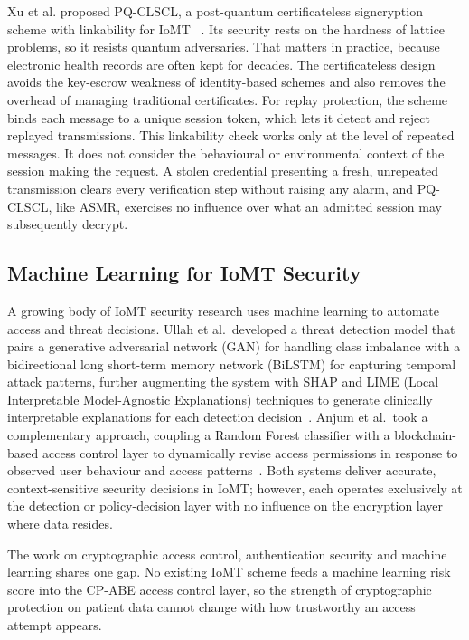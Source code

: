 Xu et al. proposed PQ-CLSCL, a post-quantum certificateless signcryption scheme with linkability for IoMT ~\cite{xu2025pqclscl}. Its security rests on the hardness of lattice problems, so it resists quantum adversaries. That matters in practice, because electronic health records are often kept for decades. The certificateless design avoids the key-escrow weakness of identity-based schemes and also removes the overhead of managing traditional certificates. For replay protection, the scheme binds each message to a unique session token, which lets it detect and reject replayed transmissions. This linkability check works only at the level of repeated messages. It does not consider the behavioural or environmental context of the session making the request. A stolen credential presenting a fresh, unrepeated transmission clears every verification step without raising any alarm, and PQ-CLSCL, like ASMR, exercises no influence over what an admitted session may subsequently decrypt.

\subsection{Machine Learning for IoMT Security} %
\label{sec1.1.3}

A growing body of IoMT security research uses machine learning to automate access and threat decisions. Ullah et al.\ developed a threat detection model that pairs a generative adversarial network (GAN) for handling class imbalance with a bidirectional long short-term memory network (BiLSTM) for capturing temporal attack patterns, further augmenting the system with SHAP and LIME (Local Interpretable Model-Agnostic Explanations) techniques to generate clinically interpretable explanations for each detection decision~\cite{ullah2025interpretable}. Anjum et al.\ took a complementary approach, coupling a Random Forest classifier with a blockchain-based access control layer to dynamically revise access permissions in response to observed user behaviour and access patterns~\cite{anjum2025blockchain}. Both systems deliver accurate, context-sensitive security decisions in IoMT; however, each operates exclusively at the detection or policy-decision layer with no influence on the encryption layer where data resides.

The work on cryptographic access control, authentication security and machine learning shares one gap. No existing IoMT scheme feeds a machine learning risk score into the CP-ABE access control layer, so the strength of cryptographic protection on patient data cannot change with how trustworthy an access attempt appears.

